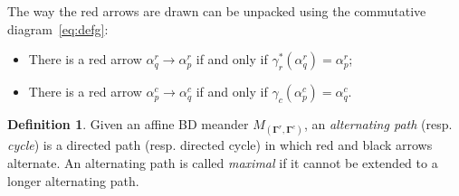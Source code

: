 \documentclass[11pt]{article}
\newcommand{\bg}{\mathbf{\Gamma}}
\theoremstyle{definition}\newtheorem{definition}[theorem]{Definition}
\theoremstyle{definition}\newtheorem{remark}[theorem]{Remark}
\theoremstyle{remark}
\numberwithin{equation}{section}
\begin{document}
 The way the red arrows are drawn can be unpacked using the commutative diagram~\eqref{eq:defg}:
 \begin{itemize}
     \item There is a red arrow $\alpha_q^r \rightarrow \alpha_p^r$ if and only if $\gamma_r^*(\alpha_q^r) = \alpha_p^r$;
     \item There is a red arrow $\alpha_p^c \rightarrow \alpha_q^c$ if and only if $\gamma_c(\alpha_p^c) = \alpha_q^c$.
 \end{itemize}

\begin{definition}
    Given an affine BD meander $M_{(\bg^r,\bg^c)}$, an \emph{alternating path} (resp. \emph{cycle}) is a directed path (resp. directed cycle) in which red and black arrows alternate. An alternating path is called \emph{maximal} if it cannot be extended to a longer alternating path.
\end{definition}
\end{document}
